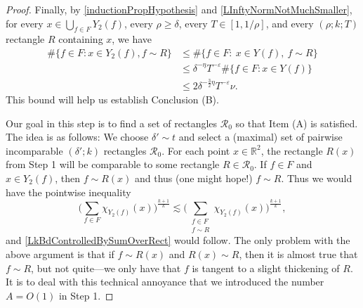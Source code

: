 \documentclass[letterpaper, reqno,11pt]{article}
\numberwithin{equation}{section}
\newcommand{\RR}{\mathbb{R}}
\newcommand{\eps}{\varepsilon}
\numberwithin{thm}{section}
\theoremstyle{remark}
\begin{document}
\begin{proof}
Finally, by \eqref{inductionPropHypothesis} and \eqref{LInftyNormNotMuchSmaller}, for every $x\in \bigcup_{f\in F} Y_2(f)$, every $\rho\geq\delta$, every $T\in [1, 1/\rho]$, and every $(\rho; k; T)$ rectangle $R$ containing $x$, we have
%
\begin{equation}\label{notTooManyKp1RectanglesThruX}
\begin{split}
\#\{f\in F\colon x\in Y_2(f), f\sim R\} & \leq \#\{f\in F\colon \ x\in Y(f),\ f\sim R\}\\
&\leq \delta^{-\eta}T^{-\eps}\#\{f\in F\colon x\in Y(f)\}\\
&\leq 2\delta^{-\frac{3}{2}\eta}T^{-\eps}\nu.
\end{split}
\end{equation}
This bound will help us establish Conclusion (B).

%

\medskip

Our goal in this step is to find a set of rectangles $\mathcal{R}_0$ so that Item (A) is satisfied. The idea is as follows: We choose $\delta'\sim t$ and select a (maximal) set of pairwise incomparable $(\delta';k)$ rectangles $\mathcal{R}_0$. For each point $x\in\RR^2$, the rectangle $R(x)$ from Step 1 will be comparable to some rectangle $R\in \mathcal{R}_0$. If $f\in F$ and $x\in Y_2(f)$, then $f\sim R(x)$ and thus (one might hope!) $f\sim R$. Thus we would have the pointwise inequality
\begin{equation}\label{onlyComparableRectanglesContribute}
\Big(\sum_{f\in F}\chi_{Y_2(f)}(x)\Big)^{\frac{k+1}{k}}\lesssim \Big(\sum_{\substack{f\in F\\ f\sim R}}\chi_{Y_2(f)}(x)\Big)^{\frac{k+1}{k}},
\end{equation}
and \eqref{LkBdControlledBySumOverRect} would follow. The only problem with the above argument is that if $f\sim R(x)$ and $R(x)\sim R$, then it is almost true that $f\sim R$, but not quite---we only have that $f$ is tangent to a slight thickening of $R$. It is to deal with this technical annoyance that we introduced the number $A = O(1)$ in Step 1.


\end{proof}
\end{document}
